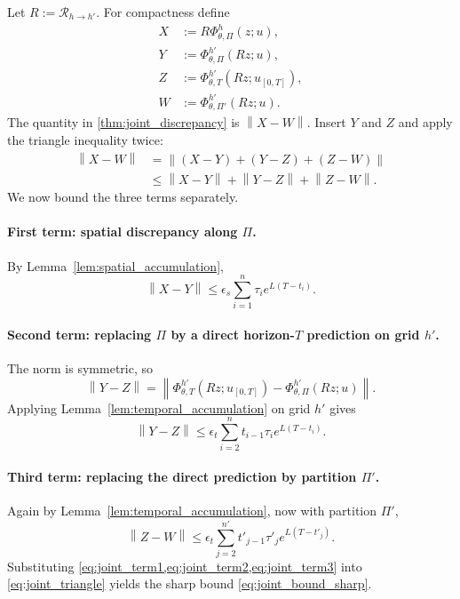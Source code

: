 \documentclass{article}
\theoremstyle{plain}
\theoremstyle{definition}
\theoremstyle{remark}
\newcommand{\PhiOp}{\Phi}
\newcommand{\Restr}{\mathcal{R}}
\newcommand{\norm}[1]{\left\lVert #1 \right\rVert}
\begin{document}
Let $R:=\Restr_{h\rightarrow h'}$. For compactness define
\begin{align}
X&:=R\PhiOp^{h}_{\theta,\Pi}(z;u),\\
Y&:=\PhiOp^{h'}_{\theta,\Pi}(Rz;u),\\
Z&:=\PhiOp^{h'}_{\theta,T}(Rz;u_{[0,T]}),\\
W&:=\PhiOp^{h'}_{\theta,\Pi'}(Rz;u).
\end{align}
The quantity in \cref{thm:joint_discrepancy} is $\norm{X-W}$. Insert $Y$ and $Z$ and apply the triangle inequality twice:
\begin{align}
\norm{X-W}
&=\norm{(X-Y)+(Y-Z)+(Z-W)}
\nonumber\\
&\le
\norm{X-Y}+\norm{Y-Z}+\norm{Z-W}.
\label{eq:joint_triangle}
\end{align}
We now bound the three terms separately.

\paragraph{First term: spatial discrepancy along $\Pi$.}
By Lemma~\ref{lem:spatial_accumulation},
\begin{equation}
\norm{X-Y}
\le
\epsilon_s
\sum_{i=1}^{n}\tau_i e^{L(T-t_i)}.
\label{eq:joint_term1}
\end{equation}

\paragraph{Second term: replacing $\Pi$ by a direct horizon-$T$ prediction on grid $h'$.}
The norm is symmetric, so
\begin{equation}
\norm{Y-Z}
=
\norm{
\PhiOp^{h'}_{\theta,T}(Rz;u_{[0,T]})
-
\PhiOp^{h'}_{\theta,\Pi}(Rz;u)
}.
\end{equation}
Applying Lemma~\ref{lem:temporal_accumulation} on grid $h'$ gives
\begin{equation}
\norm{Y-Z}
\le
\epsilon_t
\sum_{i=2}^{n}t_{i-1}\tau_i e^{L(T-t_i)}.
\label{eq:joint_term2}
\end{equation}

\paragraph{Third term: replacing the direct prediction by partition $\Pi'$.}
Again by Lemma~\ref{lem:temporal_accumulation}, now with partition $\Pi'$,
\begin{equation}
\norm{Z-W}
\le
\epsilon_t
\sum_{j=2}^{n'}t'_{j-1}\tau'_j e^{L(T-t'_j)}.
\label{eq:joint_term3}
\end{equation}
Substituting \cref{eq:joint_term1,eq:joint_term2,eq:joint_term3} into \cref{eq:joint_triangle} yields the sharp bound \cref{eq:joint_bound_sharp}.
\end{document}

